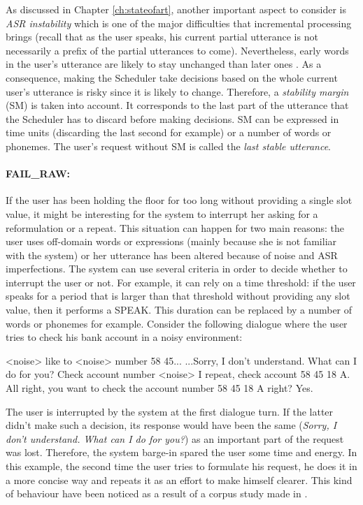			As discussed in Chapter \ref{ch:stateofart}, another important aspect to consider is \textit{ASR instability} which is one of the major difficulties that incremental processing brings (recall that as the user speaks, his current partial utterance is not necessarily a prefix of the partial utterances to come). Nevertheless, early words in the user's utterance are likely to stay unchanged than later ones \cite{McGraw2012}. As a consequence, making the Scheduler take decisions based on the whole current user's utterance is risky since it is likely to change. Therefore, a \textit{stability margin} (SM) is taken into account. It corresponds to the last part of the utterance that the Scheduler has to discard before making decisions. SM can be expressed in time units (discarding the last second for example) or a number of words or phonemes. The user's request without SM is called the \textit{last stable utterance}.

     \paragraph{FAIL\_RAW:} If the user has been holding the floor for too long without providing a single slot value, it might be interesting for the system to interrupt her asking for a reformulation or a repeat. This situation can happen for two main reasons: the user uses off-domain words or expressions (mainly because she is not familiar with the system) or her utterance has been altered because of noise and ASR imperfections. The system can use several criteria in order to decide whether to interrupt the user or not. For example, it can rely on a time threshold: if the user speaks for a period that is larger than that threshold without providing any slot value, then it performs a SPEAK. This duration can be replaced by a number of words or phonemes for example. Consider the following dialogue where the user tries to check his bank account in a noisy environment:

          \begin{dialogue}
             <noise> like to <noise> number 58 45...
             ...Sorry, I don't understand. What can I do for you?
             Check account number <noise> I repeat, check account 58 45 18 A.
             All right, you want to check the account number 58 45 18 A right?
             Yes.
          \end{dialogue}

          The user is interrupted by the system at the first dialogue turn. If the latter didn't make such a decision, its response would have been the same (\textit{Sorry, I don't understand. What can I do for you?}) as an important part of the request was lost. Therefore, the system barge-in spared the user some time and energy. In this example, the second time the user tries to formulate his request, he does it in a more concise way and repeats it as an effort to make himself clearer. This kind of behaviour have been noticed as a result of a corpus study made in \cite{Ghigi2014}.

